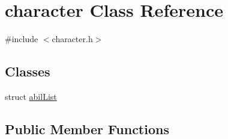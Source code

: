 \hypertarget{classcharacter}{}\section{character Class Reference}
\label{classcharacter}


{\ttfamily \#include $<$character.\+h$>$}

\subsection*{Classes}
\begin{DoxyCompactItemize}
\item 
struct \hyperlink{structcharacter_1_1abil_list}{abil\+List}
\end{DoxyCompactItemize}
\subsection*{Public Member Functions}
